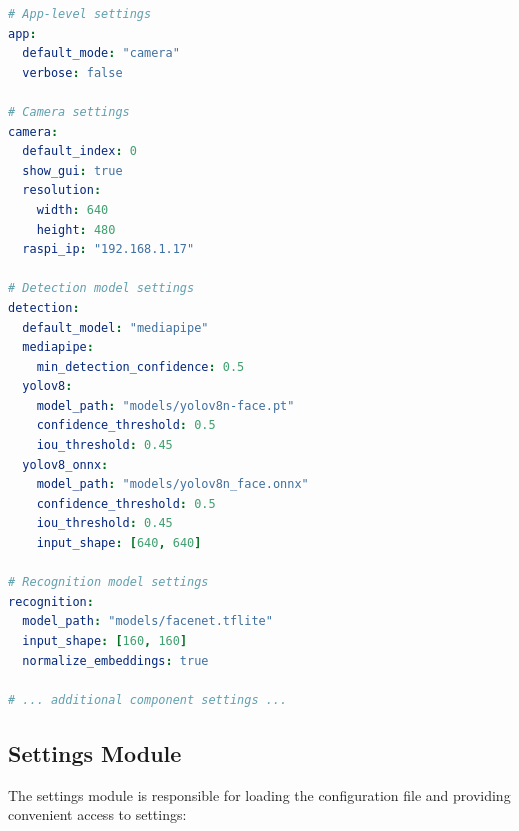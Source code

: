 \begin{lstlisting}[language=yaml, caption=Configuration File Structure]
# App-level settings
app:
  default_mode: "camera"
  verbose: false
  
# Camera settings
camera:
  default_index: 0
  show_gui: true
  resolution:
    width: 640
    height: 480
  raspi_ip: "192.168.1.17"

# Detection model settings
detection:
  default_model: "mediapipe"
  mediapipe:
    min_detection_confidence: 0.5
  yolov8:
    model_path: "models/yolov8n-face.pt"
    confidence_threshold: 0.5
    iou_threshold: 0.45
  yolov8_onnx:
    model_path: "models/yolov8n_face.onnx"
    confidence_threshold: 0.5
    iou_threshold: 0.45
    input_shape: [640, 640]
    
# Recognition model settings
recognition:
  model_path: "models/facenet.tflite"
  input_shape: [160, 160]
  normalize_embeddings: true
  
# ... additional component settings ...
\end{lstlisting}

\subsection{Settings Module}
The settings module is responsible for loading the configuration file and providing convenient access to settings:

